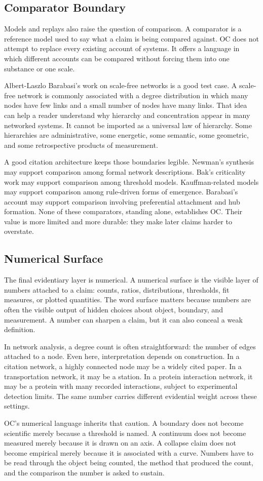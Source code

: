 \documentclass[11pt,a4paper,openany]{book}
\begin{document}
\subsection{Comparator Boundary}
Models and replays also raise the question of comparison. A comparator is a reference model used to say what a claim is being compared against. OC does not attempt to replace every existing account of systems. It offers a language in which different accounts can be compared without forcing them into one substance or one scale. \cite{raf_networks,bak_soc}\par
Albert-Laszlo Barabasi's work on scale-free networks is a good test case. A scale-free network is commonly associated with a degree distribution in which many nodes have few links and a small number of nodes have many links. That idea can help a reader understand why hierarchy and concentration appear in many networked systems. It cannot be imported as a universal law of hierarchy. Some hierarchies are administrative, some energetic, some semantic, some geometric, and some retrospective products of measurement.\par
A good citation architecture keeps those boundaries legible. Newman's synthesis may support comparison among formal network descriptions. Bak's criticality work may support comparison among threshold models. Kauffman-related models may support comparison among rule-driven forms of emergence. Barabasi's account may support comparison involving preferential attachment and hub formation. None of these comparators, standing alone, establishes OC. Their value is more limited and more durable: they make later claims harder to overstate.\par
\subsection{Numerical Surface}
The final evidentiary layer is numerical. A numerical surface is the visible layer of numbers attached to a claim: counts, ratios, distributions, thresholds, fit measures, or plotted quantities. The word surface matters because numbers are often the visible output of hidden choices about object, boundary, and measurement. A number can sharpen a claim, but it can also conceal a weak definition. \cite{raf_networks,bak_soc}\par
In network analysis, a degree count is often straightforward: the number of edges attached to a node. Even here, interpretation depends on construction. In a citation network, a highly connected node may be a widely cited paper. In a transportation network, it may be a station. In a protein interaction network, it may be a protein with many recorded interactions, subject to experimental detection limits. The same number carries different evidential weight across these settings.\par
OC's numerical language inherits that caution. A boundary does not become scientific merely because a threshold is named. A continuum does not become measured merely because it is drawn on an axis. A collapse claim does not become empirical merely because it is associated with a curve. Numbers have to be read through the object being counted, the method that produced the count, and the comparison the number is asked to sustain.\par
\end{document}
